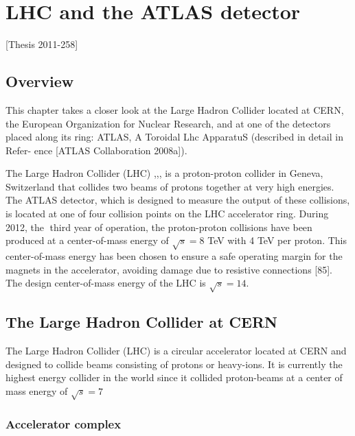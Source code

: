 \chapter{LHC and the ATLAS detector }\label{chap:lhc}

[Thesis 2011-258]

\section{Overview}
This chapter  takes a closer look at the Large Hadron Collider located at CERN,
the European Organization for Nuclear Research, and at one of the detectors placed
along its ring: ATLAS, A Toroidal Lhc ApparatuS (described in detail in Refer-
ence [ATLAS Collaboration 2008a]).



The Large Hadron Collider (LHC) \cite{lhc1},\cite{lhc2},\cite{lhc3},\cite{lhc4} is a proton-proton collider in Geneva,
Switzerland that collides two beams of protons together at very high energies. The ATLAS
detector, which is designed to measure the output of these collisions, is located at one of
four collision points on the LHC accelerator ring. During 2012, the third year of operation,
the proton-proton collisions have been produced at a center-of-mass energy of $\sqrt{s}= 8$ TeV
with 4 TeV per proton. This center-of-mass energy has been chosen to ensure a safe
operating margin for the magnets in the accelerator, avoiding damage due to resistive
connections [85]. The design center-of-mass energy of the LHC is $\sqrt{s}= 14$.


\section{The Large Hadron Collider at CERN}
The Large Hadron Collider (LHC) is a circular accelerator located at CERN and designed
to collide beams consisting of protons or heavy-ions. It is currently the highest energy
collider in the world since it collided proton-beams at a center of mass energy of $\sqrt{s}= 7$

\subsection{Accelerator complex}

